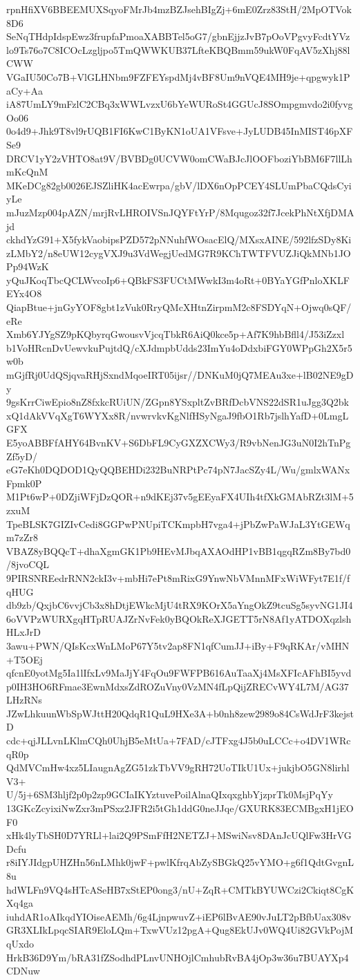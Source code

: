 rpnHfiXV6BBEEMUXSqyoFMrJb4mzBZJsehBIgZj+6mE0Zrz83StH/2MpOTVok8D6
SeNqTHdpIdspEwz3frupfaPmoaXABBTel5oG7/gbnEjjzJvB7pOoVPgvyFcdtYVz
lo9Ts76o7C8ICOcLzgljpo5TmQWWKUB37LfteKBQBmm59ukW0FqAV5zXhj88lCWW
VGaIU50Co7B+VlGLHNbm9FZFEYspdMj4vBF8Um9nVQE4MH9je+qpgwyk1PaCy+Aa
iA87UmLY9mFzlC2CBq3xWWLvzxU6bYeWURoSt4GGUcJ8SOmpgmvdo2i0fyvgOo06
0o4d9+Jhk9T8vl9rUQB1FI6KwC1ByKN1oUA1VFsve+JyLUDB45InMIST46pXFSe9
DRCV1yY2zVHTO8at9V/BVBDg0UCVW0omCWaBJcJlOOFboziYbBM6F7llLhmKcQnM
MKeDCg82gb0026EJSZliHK4acEwrpa/gbV/lDX6nOpPCEY4SLUmPbaCQdsCyiyLe
mJuzMzp004pAZN/mrjRvLHROIVSnJQYFtYrP/8Mqugoz32f7JcekPhNtXfjDMAjd
ckhdYzG91+X5fykVaobipsPZD572pNNuhfWOsacElQ/MXsxAINE/592lfzSDy8Ki
zLMbY2/n8eUW12cygVXJ9u3VdWegjUedMG7R9KChTWTFVUZJiQkMNb1JOPp94WzK
yQuJKoqTbcQCLWvcoIp6+QBkFS3FUCtMWwkI3m4oRt+0BYaYGfPnloXKLFEYx4O8
QiapBtue+jnGyYOF8gbt1zVuk0RryQMcXHtnZirpmM2c8FSDYqN+Ojwq0sQF/eRe
Xmb6YJYgSZ9pKQbyrqGwousvVjcqTbkR6AiQ0kce5p+Af7K9hbBfll4/J53iZzxl
b1VoHRcnDvUewvkuPujtdQ/cXJdmpbUdds23ImYu4oDdxbiFGY0WPpGh2X5r5w0b
mGjfRj0UdQSjqvaRHjSxndMqoeIRT05ijsr//DNKuM0jQ7MEAu3xe+lB02NE9gDy
9gsKrrCiwEpio8nZ8fxkcRUiUN/ZGpn8YSxpltZvBRfDcbVNS22dSR1uJgg3Q2bk
xQ1dAkVVqXgT6WYXx8R/nvwrvkvKgNlfHSyNgaJ9fbO1Rb7jslhYafD+0LmgLGFX
E5yoABBFfAHY64BvnKV+S6DbFL9CyGXZXCWy3/R9vbNenJG3uN0I2hTnPgZf5yD/
eG7eKh0DQDOD1QyQQBEHDi232BuNRPtPc74pN7JacSZy4L/Wu/gmlxWANxFpmk0P
M1Pt6wP+0DZjiWFjDzQOR+n9dKEj37v5gEEyaFX4UIh4tfXkGMAbRZt3lM+5zxuM
TpeBLSK7GIZIvCedi8GGPwPNUpiTCKmpbH7vga4+jPbZwPaWJaL3YtGEWqm7zZr8
VBAZ8yBQQcT+dhaXgmGK1Pb9HEvMJbqAXAOdHP1vBB1qgqRZm8By7bd0/8jvoCQL
9PIRSNREedrRNN2ckI3v+mbHi7ePt8mRixG9YnwNbVMnnMFxWiWFyt7E1f/fqHUG
db9zb/QxjbC6vvjCb3x8hDtjEWkcMjU4tRX9KOrX5aYngOkZ9tcuSg5syvNG1JI4
6oVVPzWURXgqHTpRUAJZrNvFek0yBQOkReXJGETT5rN8Af1yATDOXqzlshHLxJrD
3awu+PWN/QIsKcxWnLMoP67Y5tv2ap8FN1qfCumJJ+iBy+F9qRKAr/vMHN+T5OEj
qfcnE0yotMg5Ia1lIfxLv9MaJjY4FqOu9FWFPB616AuTaaXj4MsXFIcAFhBI5yvd
p0IH3HO6RFmae3EwnMdxsZdROZuVny0VzMN4fLpQijZRECvWY4L7M/AG37LHzRNs
JZwLhkuunWbSpWJttH20QdqR1QuL9HXe3A+b0nh8zew2989o84CsWdJrF3kejstD
cdc+qjJLLvnLKlmCQh0UhjB5eMtUa+7FAD/cJTFxg4J5b0uLCCc+o4DV1WRcqR0p
QdMVCmHw4xz5LIaugnAgZG51zkTbVV9gRH72UoTIkU1Ux+jukjbO5GN8lirhlV3+
U/5j+6SM3hljf2p0p2zp9GCIaIKYztuvePoilAlnaQIxqxghbYjzprTk0MsjPqYy
13GKcZcyixiNwZxr3mPSxz2JFR2i5tGh1ddG0neJJqe/GXURK83ECMBgxH1jEOF0
xHk4lyTbSH0D7YRLl+lai2Q9PSmFfH2NETZJ+MSwiNsv8DAnJcUQlFw3HrVGDcfu
r8iIYJIdgpUHZHn56nLMhk0jwF+pwlKfrqAbZySBGkQ25vYMO+g6f1QdtGvgnL8u
hdWLFn9VQ4sHTcASeHB7xStEP0ong3/nU+ZqR+CMTkBYUWCzi2Ckiqt8CgKXq4ga
iuhdAR1oAIkqdYIOiseAEMh/6g4LjnpwuvZ+iEP6lBvAE90vJuLT2pBfbUax308v
GR3XLIkLpqcSIAR9EloLQm+TxwVUz12pgA+Qug8EkUJv0WQ4Ui82GVkPojMqUxdo
HrkB36D9Ym/bRA31fZSodhdPLnvUNHOjlCmhubRvBA4jOp3w36u7BUAYXp4CDNuw
